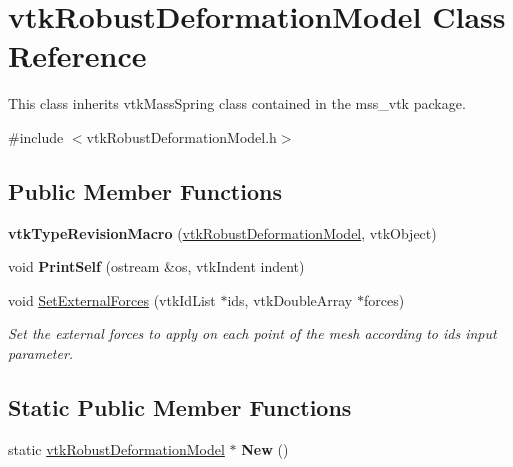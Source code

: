 \hypertarget{classvtkRobustDeformationModel}{
\section{vtkRobustDeformationModel Class Reference}
\label{classvtkRobustDeformationModel}
}


This class inherits vtkMassSpring class contained in the mss\_\-vtk package.  


{\ttfamily \#include $<$vtkRobustDeformationModel.h$>$}\subsection*{Public Member Functions}
\begin{DoxyCompactItemize}
\item 
\hypertarget{classvtkRobustDeformationModel_afe8cb1ad560a72c68f99433f1aa3498a}{
{\bfseries vtkTypeRevisionMacro} (\hyperlink{classvtkRobustDeformationModel}{vtkRobustDeformationModel}, vtkObject)}
\label{classvtkRobustDeformationModel_afe8cb1ad560a72c68f99433f1aa3498a}

\item 
\hypertarget{classvtkRobustDeformationModel_afcc90c29d7df1c88f46e24af0a4268fd}{
void {\bfseries PrintSelf} (ostream \&os, vtkIndent indent)}
\label{classvtkRobustDeformationModel_afcc90c29d7df1c88f46e24af0a4268fd}

\item 
void \hyperlink{classvtkRobustDeformationModel_aaa1d4245a3bcc536f145e2686f6135f6}{SetExternalForces} (vtkIdList $\ast$ids, vtkDoubleArray $\ast$forces)
\begin{DoxyCompactList}\small\item\em Set the external forces to apply on each point of the mesh according to ids input parameter. \item\end{DoxyCompactList}\end{DoxyCompactItemize}
\subsection*{Static Public Member Functions}
\begin{DoxyCompactItemize}
\item 
\hypertarget{classvtkRobustDeformationModel_a4b02cc2f1212b0ef2723b852458788e3}{
static \hyperlink{classvtkRobustDeformationModel}{vtkRobustDeformationModel} $\ast$ {\bfseries New} ()}
\label{classvtkRobustDeformationModel_a4b02cc2f1212b0ef2723b852458788e3}

\end{DoxyCompactItemize}


